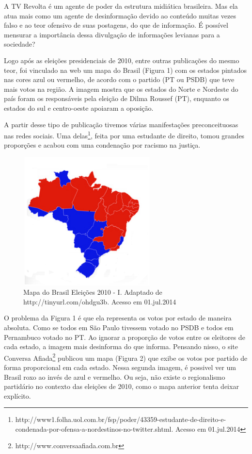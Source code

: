 \documentclass[
	article,			%
	12pt,				%
	oneside,			%
	a4paper,			%
	english,			%
	brazil,				%
	]{abntex2}
\begin{document}
A TV Revolta é um agente de poder da estrutura midiática brasileira. Mas ela atua mais como um agente de desinformação devido ao conteúdo muitas vezes falso e ao teor ofensivo de suas postagens, do que de informação. É possível mensurar a importância dessa divulgação de informações levianas para a sociedade?

Logo após as eleições presidenciais de 2010, entre outras publicações do mesmo teor, foi vinculado na web um mapa do Brasil (Figura 1) com os estados pintados nas cores azul ou vermelho, de acordo com o partido (PT ou PSDB) que teve mais votos na região. A imagem mostra que os estados do Norte e Nordeste do país foram os responsáveis pela eleição de Dilma Roussef (PT), enquanto os estados do sul e centro-oeste apoiaram a oposição.

A partir desse tipo de publicação tivemos várias manifestações preconceituosas nas redes sociais. Uma delas\footnote{http://www1.folha.uol.com.br/fsp/poder/43359-estudante-de-direito-e-condenada-por-ofensa-a-nordestinos-no-twitter.shtml. Acesso em 01.jul.2014}, feita por uma estudante de direito, tomou grandes proporções e acabou com uma condenação por racismo na justiça. 

\begin{figure}[ht!]
\centering
\includegraphics[width=70mm,height=70mm]{mapa_1.png}
\caption{Mapa do Brasil Eleições 2010 - I. Adaptado de http://tinyurl.com/ohdgu3b. Acesso em 01.jul.2014}
\label{overflow}
\end{figure}

O problema da Figura 1 é que ela representa os votos por estado de maneira absoluta. Como se todos em São Paulo tivessem votado no PSDB e todos em Pernambuco votado no PT. Ao ignorar a proporção de votos entre os eleitores de cada estado, a imagem mais desinforma do que informa. Pensando nisso, o site Conversa Afiada\footnote{http://www.conversaafiada.com.br} publicou um mapa (Figura 2) que exibe os votos por partido de forma proporcional em cada estado. Nessa segunda imagem, é possivel ver um Brasil roxo ao invés de azul e vermelho. Ou seja, não existe o regionalismo partidário no contexto das eleições de 2010, como o mapa anterior tenta deixar explícito.
\end{document}
